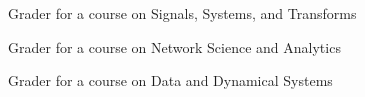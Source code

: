 \begin{resume}
\begin{position}
Grader for a course on Signals, Systems, and Transforms
\end{position}

\begin{position}
Grader for a course on Network Science and Analytics
\end{position}

\begin{position}
Grader for a course on Data and Dynamical Systems
\end{position}




%


\end{resume}
